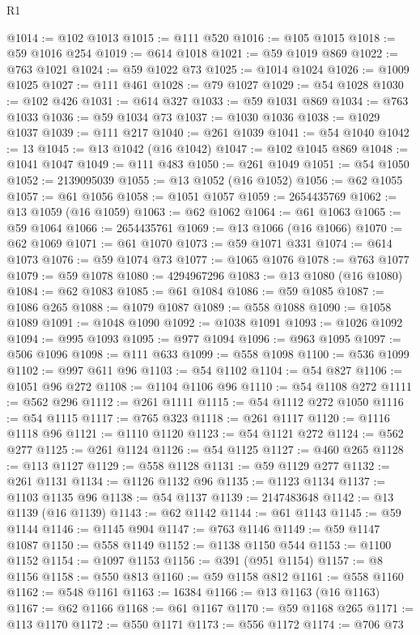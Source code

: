 \begin{lexlean}{R1}
\begin{coremodule}
@1014 := @102 @1013
@1015 := @111 @520
@1016 := @105 @1015
@1018 := @59 @1016 @254
@1019 := @614 @1018
@1021 := @59 @1019 @869
@1022 := @763 @1021
@1024 := @59 @1022 @73
@1025 := @1014 @1024
@1026 := @1009 @1025
@1027 := @111 @461
@1028 := @79 @1027
@1029 := @54 @1028
@1030 := @102 @426
@1031 := @614 @327
@1033 := @59 @1031 @869
@1034 := @763 @1033
@1036 := @59 @1034 @73
@1037 := @1030 @1036
@1038 := @1029 @1037
@1039 := @111 @217
@1040 := @261 @1039
@1041 := @54 @1040
@1042 := 13
@1045 := @13 @1042 (@16 @1042)
@1047 := @102 @1045 @869
@1048 := @1041 @1047
@1049 := @111 @483
@1050 := @261 @1049
@1051 := @54 @1050
@1052 := 2139095039
@1055 := @13 @1052 (@16 @1052)
@1056 := @62 @1055
@1057 := @61 @1056
@1058 := @1051 @1057
@1059 := 2654435769
@1062 := @13 @1059 (@16 @1059)
@1063 := @62 @1062
@1064 := @61 @1063
@1065 := @59 @1064
@1066 := 2654435761
@1069 := @13 @1066 (@16 @1066)
@1070 := @62 @1069
@1071 := @61 @1070
@1073 := @59 @1071 @331
@1074 := @614 @1073
@1076 := @59 @1074 @73
@1077 := @1065 @1076
@1078 := @763 @1077
@1079 := @59 @1078
@1080 := 4294967296
@1083 := @13 @1080 (@16 @1080)
@1084 := @62 @1083
@1085 := @61 @1084
@1086 := @59 @1085
@1087 := @1086 @265
@1088 := @1079 @1087
@1089 := @558 @1088
@1090 := @1058 @1089
@1091 := @1048 @1090
@1092 := @1038 @1091
@1093 := @1026 @1092
@1094 := @995 @1093
@1095 := @977 @1094
@1096 := @963 @1095
@1097 := @506 @1096
@1098 := @111 @633
@1099 := @558 @1098
@1100 := @536 @1099
@1102 := @997 @611 @96
@1103 := @54 @1102
@1104 := @54 @827
@1106 := @1051 @96 @272
@1108 := @1104 @1106 @96
@1110 := @54 @1108 @272
@1111 := @562 @296
@1112 := @261 @1111
@1115 := @54 @1112 @272 @1050
@1116 := @54 @1115
@1117 := @765 @323
@1118 := @261 @1117
@1120 := @1116 @1118 @96
@1121 := @1110 @1120
@1123 := @54 @1121 @272
@1124 := @562 @277
@1125 := @261 @1124
@1126 := @54 @1125
@1127 := @460 @265
@1128 := @113 @1127
@1129 := @558 @1128
@1131 := @59 @1129 @277
@1132 := @261 @1131
@1134 := @1126 @1132 @96
@1135 := @1123 @1134
@1137 := @1103 @1135 @96
@1138 := @54 @1137
@1139 := 2147483648
@1142 := @13 @1139 (@16 @1139)
@1143 := @62 @1142
@1144 := @61 @1143
@1145 := @59 @1144
@1146 := @1145 @904
@1147 := @763 @1146
@1149 := @59 @1147 @1087
@1150 := @558 @1149
@1152 := @1138 @1150 @544
@1153 := @1100 @1152
@1154 := @1097 @1153
@1156 := @391 (@951 @1154)
@1157 := @8 @1156
@1158 := @550 @813
@1160 := @59 @1158 @812
@1161 := @558 @1160
@1162 := @548 @1161
@1163 := 16384
@1166 := @13 @1163 (@16 @1163)
@1167 := @62 @1166
@1168 := @61 @1167
@1170 := @59 @1168 @265
@1171 := @113 @1170
@1172 := @550 @1171
@1173 := @556 @1172
@1174 := @706 @73

\end{coremodule}
\end{lexlean}
